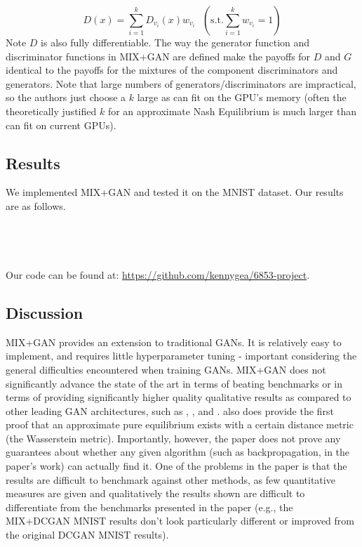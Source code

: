 \documentclass{article}
\begin{document}
\[
  D(x) = \sum\limits_{i = 1}^k D_{v_i}(x) w_{v_i} \mbox{  } (\mbox{s.t.} \sum\limits_{i=1}^k w_{v_i} = 1)
\]
Note $D$ is also fully differentiable. The way the generator function and discriminator functions in MIX+GAN are defined make the payoffs for $D$ and $G$ identical to the payoffs for the mixtures of the component discriminators and generators. Note that large numbers of generators/discriminators are impractical, so the authors just choose a $k$ large as can fit on the GPU's memory (often the theoretically justified $k$ for an approximate Nash Equilibrium is much larger than can fit on current GPUs).

\subsection{Results}
We implemented MIX+GAN and tested it on the MNIST dataset. Our results are as follows.
\\\\\\\\\\
Our code can be found at: \url{https://github.com/kennygea/6853-project}.
\subsection{Discussion}
MIX+GAN provides an extension to traditional GANs. It is relatively easy to implement, and requires little hyperparameter tuning - important considering the general difficulties encountered when training GANs. MIX+GAN does not significantly advance the state of the art in terms of beating benchmarks or in terms of providing significantly higher quality qualitative results as compared to other leading GAN architectures, such as \citet{DBLP:journals/corr/HuangLPHB16}, \citet{Salimans2016}, and \citet{DBLP:journals/corr/OdenaOS16}. \citet{Arora17} also does provide the first proof that an approximate pure equilibrium exists with a certain distance metric (the Wasserstein metric). Importantly, however, the paper does not prove any guarantees about whether any given algorithm (such as backpropagation, in the paper's work) can actually find it. One of the problems in the paper is that the results are difficult to benchmark against other methods, as few quantitative measures are given and qualitatively the results shown are difficult to differentiate from the benchmarks presented in the paper (e.g., the MIX+DCGAN MNIST results don't look particularly different or improved from the original DCGAN MNIST results). 


\end{document}
